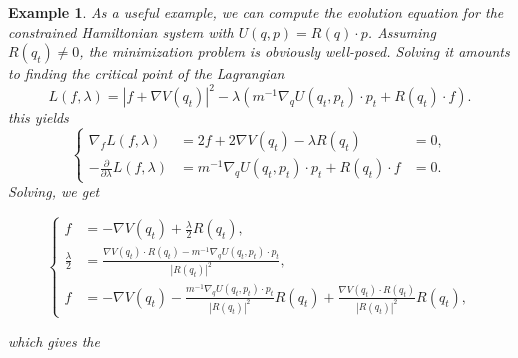 \documentclass[a4paper,10pt,twoside,leqno]{report}
\newtheorem{example}{Example}
\newcommand{\1}{\mathbbm{1}}
\begin{document}
    \begin{example}
        As a useful example, we can compute the evolution equation for the constrained Hamiltonian system with $U(q,p)=R(q)\cdot p$.
        Assuming $R(q_t)\neq 0$, the minimization problem is obviously well-posed. Solving it amounts to finding the critical point of the Lagrangian
        \[L(f,\lambda)=|f+\nabla V(q_t)|^2-\lambda (m^{-1}\nabla_q U(q_t,p_t)\cdot p_t +R(q_t)\cdot f).\]
        this yields 
        \begin{equation}
            \left\{
                \begin{aligned}
                    \nabla_f L(f,\lambda)&=2f+2\nabla V(q_t)-\lambda R(q_t)&=0,\\
                    -\frac{\partial}{\partial \lambda}L(f,\lambda)&=m^{-1}\nabla_q U(q_t,p_t)\cdot p_t +R(q_t)\cdot f&=0.
                \end{aligned}
            \right.
        \end{equation}
    Solving, we get 
    
    \begin{equation}
        \left\{
            \begin{aligned}
                f&=-\nabla V(q_t)+\frac\lambda2 R(q_t),\\
                \frac\lambda2&=\frac{\nabla V(q_t)\cdot R(q_t)-m^{-1}\nabla_q U(q_t,p_t)\cdot p_t}{|R(q_t)|^2},\\
                f&  =-\nabla V(q_t)-\frac{m^{-1}\nabla_q U(q_t,p_t)\cdot p_t}{|R(q_t)|^2}R(q_t)+\frac{\nabla V(q_t)\cdot R(q_t)}{|R(q_t)|^2}R(q_t),
            \end{aligned}
        \right.
    \end{equation}
    
    which gives the 
    \end{example}
    
\end{document}
